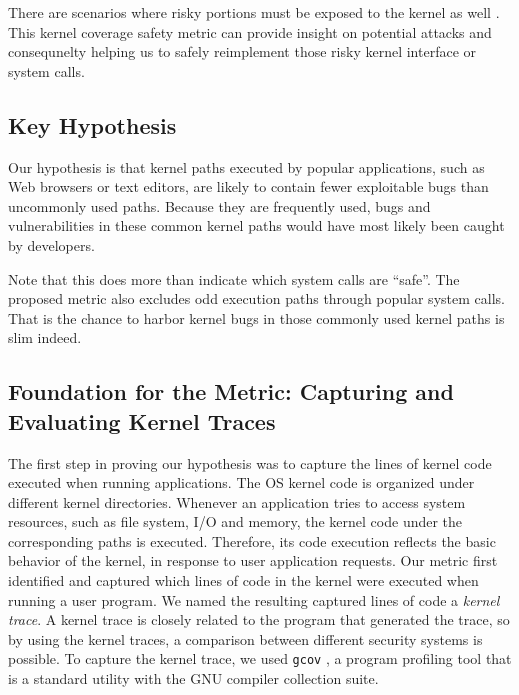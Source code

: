 There are scenarios where risky portions must be exposed to the kernel as well . This kernel coverage safety metric can provide insight on potential attacks and consequnelty helping us to safely reimplement those risky kernel interface or system calls. 



\subsection{Key Hypothesis}

Our hypothesis is that kernel paths executed by popular applications, such as Web browsers or text editors, are likely to contain fewer exploitable bugs than uncommonly used paths. Because they are frequently used, bugs and vulnerabilities in these common kernel paths would have most likely been caught by developers.

Note that this does more than indicate which system calls are ``safe''.
The proposed metric also excludes odd execution paths through popular system calls. That is the chance to harbor kernel bugs in those commonly used kernel paths is slim indeed.


\subsection{Foundation for the Metric: Capturing and Evaluating Kernel Traces}

The first step in proving our hypothesis was to capture the lines of kernel
code executed
when running applications. The OS kernel code is organized under different
kernel directories.
Whenever an application tries to access system resources, such as file
system, I/O and memory, the kernel code under the corresponding paths is executed. Therefore,
its code execution reflects the basic behavior of the kernel, in response
to user application requests.
Our metric first identified and captured which lines of code in the kernel
were executed
when running a user program. We named the resulting captured lines of
code a \textit{kernel trace}.
A kernel trace is closely related to the program that generated the trace, so
by using the kernel traces, a comparison between different
security systems is possible.
To capture the kernel trace, we used \texttt{gcov} \cite{gcov}, a program profiling
tool that is a standard utility with the GNU compiler collection
suite.


